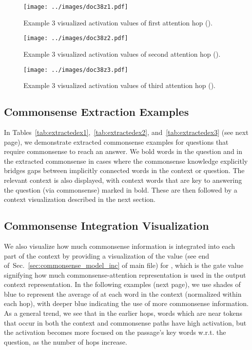 \documentclass[11pt,a4paper]{article}
\def\secref#1{Sec.~\ref{#1}}
\begin{document}
\begin{figure*}[h]
  \centering
  \texttt{[image: ../images/doc38z1.pdf]}
 \caption{Example 3 visualized activation values of first attention hop ().}
\end{figure*}
\begin{figure*}[h]
  \centering
  \texttt{[image: ../images/doc38z2.pdf]}
 \caption{Example 3 visualized activation values of second attention hop ().}
\end{figure*}
\begin{figure*}[h]
  \centering
  \texttt{[image: ../images/doc38z3.pdf]}
 \caption{Example 3 visualized activation values of third attention hop ().}
\end{figure*} 
\subsection{Commonsense Extraction Examples}
In Tables~\ref{tab:extractedex1},~\ref{tab:extractedex2}, and~\ref{tab:extractedex3} (see next page), we demonstrate extracted commonsense examples for questions that require commonsense to reach an answer. We bold words in the question and in the extracted commonsense in cases where the commonsense knowledge explicitly bridges gaps between implicitly connected words in the context or question. The relevant context is also displayed, with context words that are key to answering the question (via commonsense) marked in bold. These are then followed by a context visualization described in the next section.


\subsection{Commonsense Integration Visualization}
We also visualize how much commonsense information is integrated into each part of the context by providing a visualization of the  value (see end of~\secref{sec:commonsense_model_inc} of main file) for , which is the gate value signifying how much commonsense-attention representation is used in the output context representation. In the following examples (next page), we use shades of blue to represent the average of  at each word in the context (normalized within each hop), with deeper blue indicating the use of more commonsense information. As a general trend, we see that in the earlier hops, words which are near tokens that occur in both the context and commonsense paths have high activation, but the activation becomes more focused on the passage's key words w.r.t. the question, as the number of hops increase.


 
\end{document}
